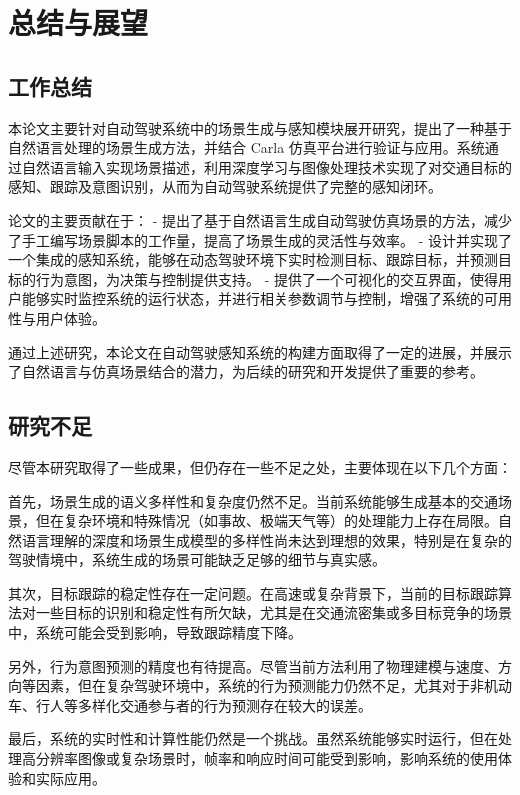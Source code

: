 \chapter{总结与展望}

\section{工作总结}

本论文主要针对自动驾驶系统中的场景生成与感知模块展开研究，提出了一种基于自然语言处理的场景生成方法，并结合 Carla 仿真平台进行验证与应用。系统通过自然语言输入实现场景描述，利用深度学习与图像处理技术实现了对交通目标的感知、跟踪及意图识别，从而为自动驾驶系统提供了完整的感知闭环。

论文的主要贡献在于：
- 提出了基于自然语言生成自动驾驶仿真场景的方法，减少了手工编写场景脚本的工作量，提高了场景生成的灵活性与效率。
- 设计并实现了一个集成的感知系统，能够在动态驾驶环境下实时检测目标、跟踪目标，并预测目标的行为意图，为决策与控制提供支持。
- 提供了一个可视化的交互界面，使得用户能够实时监控系统的运行状态，并进行相关参数调节与控制，增强了系统的可用性与用户体验。

通过上述研究，本论文在自动驾驶感知系统的构建方面取得了一定的进展，并展示了自然语言与仿真场景结合的潜力，为后续的研究和开发提供了重要的参考。

\section{研究不足}

尽管本研究取得了一些成果，但仍存在一些不足之处，主要体现在以下几个方面：

首先，场景生成的语义多样性和复杂度仍然不足。当前系统能够生成基本的交通场景，但在复杂环境和特殊情况（如事故、极端天气等）的处理能力上存在局限。自然语言理解的深度和场景生成模型的多样性尚未达到理想的效果，特别是在复杂的驾驶情境中，系统生成的场景可能缺乏足够的细节与真实感。

其次，目标跟踪的稳定性存在一定问题。在高速或复杂背景下，当前的目标跟踪算法对一些目标的识别和稳定性有所欠缺，尤其是在交通流密集或多目标竞争的场景中，系统可能会受到影响，导致跟踪精度下降。

另外，行为意图预测的精度也有待提高。尽管当前方法利用了物理建模与速度、方向等因素，但在复杂驾驶环境中，系统的行为预测能力仍然不足，尤其对于非机动车、行人等多样化交通参与者的行为预测存在较大的误差。

最后，系统的实时性和计算性能仍然是一个挑战。虽然系统能够实时运行，但在处理高分辨率图像或复杂场景时，帧率和响应时间可能受到影响，影响系统的使用体验和实际应用。

